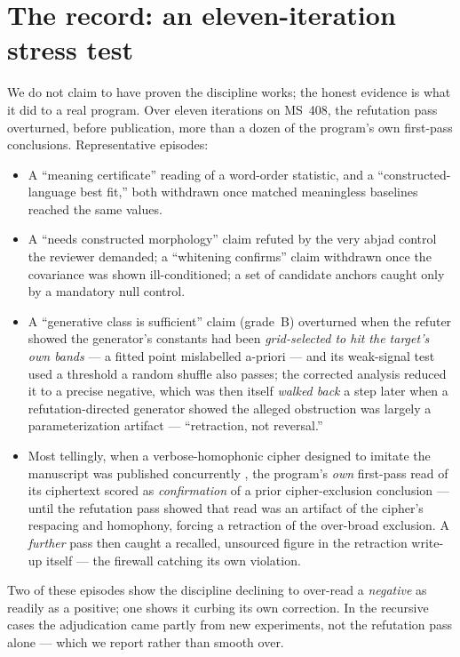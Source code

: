 \documentclass[11pt]{article}
\begin{document}
\section{The record: an eleven-iteration stress test}
\label{sec:record}
We do not claim to have proven the discipline works; the honest evidence is what it did to a real
program. Over eleven iterations on MS~408, the refutation pass overturned, before publication,
more than a dozen of the program's own first-pass conclusions. Representative episodes:
\begin{itemize}[leftmargin=1.2em,itemsep=1pt]
  \item A ``meaning certificate'' reading of a word-order statistic, and a
  ``constructed-language best fit,'' both withdrawn once matched meaningless baselines reached the
  same values.
  \item A ``needs constructed morphology'' claim refuted by the very abjad control the reviewer
  demanded; a ``whitening confirms'' claim withdrawn once the covariance was shown
  ill-conditioned; a set of candidate anchors caught only by a mandatory null control.
  \item A ``generative class is sufficient'' claim (grade~B) overturned when the refuter showed
  the generator's constants had been \emph{grid-selected to hit the target's own bands} --- a
  fitted point mislabelled a-priori --- and its weak-signal test used a threshold a random shuffle
  also passes; the corrected analysis reduced it to a precise negative, which was then itself
  \emph{walked back} a step later when a refutation-directed generator showed the alleged
  obstruction was largely a parameterization artifact --- ``retraction, not reversal.''
  \item Most tellingly, when a verbose-homophonic cipher designed to imitate the manuscript was
  published concurrently \citep{greshko2025naibbe}, the program's \emph{own} first-pass read of its ciphertext scored as
  \emph{confirmation} of a prior cipher-exclusion conclusion --- until the refutation pass showed
  that read was an artifact of the cipher's respacing and homophony, forcing a retraction of the
  over-broad exclusion. A \emph{further} pass then caught a recalled, unsourced figure in the
  retraction write-up itself --- the firewall catching its own violation.
\end{itemize}
Two of these episodes show the discipline declining to over-read a \emph{negative} as readily as
a positive; one shows it curbing its own correction. In the recursive cases the adjudication came
partly from new experiments, not the refutation pass alone --- which we report rather than smooth
over.
\end{document}
